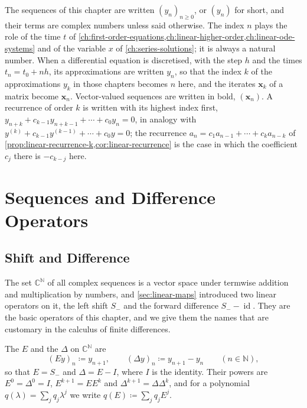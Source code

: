 The sequences of this chapter are written $(y_n)_{n\ge0}$, or $(y_n)$ for short, and their terms are complex numbers unless said otherwise. The index $n$ plays the role of the time $t$ of \cref{ch:first-order-equations,ch:linear-higher-order,ch:linear-ode-systems} and of the variable $x$ of \cref{ch:series-solutions}; it is always a natural number. When a differential equation is discretised, with the step $h$ and the times $t_n=t_0+nh$, its approximations are written $y_n$, so that the index $k$ of the approximations $y_k$ in those chapters becomes $n$ here, and the iterates $\mathbf x_k$ of a matrix become $\mathbf x_n$. Vector-valued sequences are written in bold, $(\mathbf x_n)$. A recurrence of order $k$ is written with its highest index first, $y_{n+k}+c_{k-1}y_{n+k-1}+\cdots+c_0y_n=0$, in analogy with $y^{(k)}+c_{k-1}y^{(k-1)}+\cdots+c_0y=0$; the recurrence $a_n=c_1a_{n-1}+\cdots+c_ka_{n-k}$ of \cref{prop:linear-recurrence-k,cor:linear-recurrence} is the case in which the coefficient $c_j$ there is $-c_{k-j}$ here.

\section{Sequences and Difference Operators}
\label{sec:difference-operators}

\subsection{Shift and Difference}

The set $\mathbb C^{\mathbb N}$ of all complex sequences is a vector space under termwise addition and multiplication by numbers, and \cref{sec:linear-maps} introduced two linear operators on it, the left shift $S_-$ and the forward difference $S_--\operatorname{id}$. They are the basic operators of this chapter, and we give them the names that are customary in the calculus of finite differences.

\begin{definition}
\label{def:shift-difference}
The  $E$ and the  $\Delta$ on $\mathbb C^{\mathbb N}$ are
\[
(Ey)_n\coloneqq y_{n+1},\qquad(\Delta y)_n\coloneqq y_{n+1}-y_n\qquad(n\in\mathbb N),
\]
so that $E=S_-$ and $\Delta=E-I$, where $I$ is the identity. Their powers are $E^0=\Delta^0=I$, $E^{k+1}=EE^k$ and $\Delta^{k+1}=\Delta\Delta^k$, and for a polynomial $q(\lambda)=\sum_jq_j\lambda^j$ we write $q(E)\coloneqq\sum_jq_jE^j$.
\end{definition}

